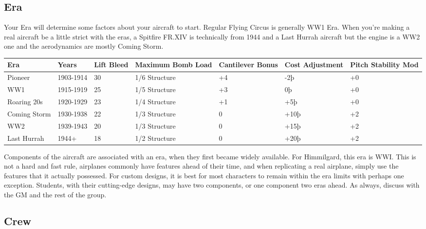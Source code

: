 \documentclass{article}
\begin{document}
\subsection{Era}
\label{_Era}

Your Era will determine some factors about your aircraft to start.
Regular Flying Circus is generally WW1 Era. When you're making a real
aircraft be a little strict with the eras, a Spitfire FR.XIV is
technically from 1944 and a Last Hurrah aircraft but the engine is a WW2
one and the aerodynamics are mostly Coming Storm.

\begin{tabular}{|l|l|l|l|l|l|l|}
  \hline
  Era          & Years               & Lift Bleed & Maximum Bomb Load & Cantilever Bonus & Cost
  Adjustment   & Pitch Stability Mod                                                                 \\\hline
  Pioneer      & 1903-1914           & 30         & 1/6 Structure     & +4               & -2þ  & +0 \\\hline
  WW1          & 1915-1919           & 25         & 1/5 Structure     & +3               & 0þ   & +0 \\\hline
  Roaring 20s  & 1920-1929           & 23         & 1/4 Structure     & +1               & +5þ  & +0 \\\hline
  Coming Storm & 1930-1938           & 22         & 1/3 Structure     & 0                & +10þ & +2 \\\hline
  WW2          & 1939-1943           & 20         & 1/3 Structure     & 0                & +15þ & +2 \\\hline
  Last Hurrah  & 1944+               & 18         & 1/2 Structure     & 0                & +20þ & +2 \\\hline
\end{tabular}

Components of the aircraft are associated with an era, when they
first became widely available. For Himmilgard, this era is WWI. This is
not a hard and fast rule, airplanes commonly have features ahead of
their time, and when replicating a real airplane, simply use the
features that it actually possessed. For custom designs, it is best for
most characters to remain within the era limits with perhaps one
exception. Students, with their cutting-edge designs, may have two
components, or one component two eras ahead. As always, discuss with the
GM and the rest of the group.

\subsection{Crew}
\label{_Crew}
\end{document}
